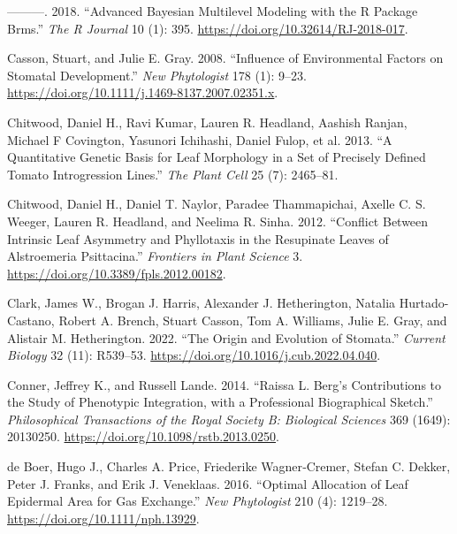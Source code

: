 \documentclass[
  12pt,
]{article}
\newlength{\cslhangindent}
\newlength{\cslentryspacingunit} %
\newenvironment{CSLReferences}[2] %
 {%
  \setlength{\parindent}{0pt}
  \ifodd #1
  \let\oldpar\par
  \def\par{\hangindent=\cslhangindent\oldpar}
  \fi
  \setlength{\parskip}{#2\cslentryspacingunit}
 }%
 {}
\begin{document}
\begin{CSLReferences}{1}{0}
\leavevmode{}%
---------. 2018. {``Advanced {Bayesian} {Multilevel} {Modeling} with the {R} {Package} Brms.''} \emph{The R Journal} 10 (1): 395. \url{https://doi.org/10.32614/RJ-2018-017}.

\leavevmode{}%
Casson, Stuart, and Julie E. Gray. 2008. {``Influence of Environmental Factors on Stomatal Development.''} \emph{New Phytologist} 178 (1): 9--23. \url{https://doi.org/10.1111/j.1469-8137.2007.02351.x}.

\leavevmode{}%
Chitwood, Daniel H., Ravi Kumar, Lauren R. Headland, Aashish Ranjan, Michael F Covington, Yasunori Ichihashi, Daniel Fulop, et al. 2013. {``A Quantitative Genetic Basis for Leaf Morphology in a Set of Precisely Defined Tomato Introgression Lines.''} \emph{The Plant Cell} 25 (7): 2465--81.

\leavevmode{}%
Chitwood, Daniel H., Daniel T. Naylor, Paradee Thammapichai, Axelle C. S. Weeger, Lauren R. Headland, and Neelima R. Sinha. 2012. {``Conflict Between {Intrinsic} {Leaf} {Asymmetry} and {Phyllotaxis} in the {Resupinate} {Leaves} of {Alstroemeria} Psittacina.''} \emph{Frontiers in Plant Science} 3. \url{https://doi.org/10.3389/fpls.2012.00182}.

\leavevmode{}%
Clark, James W., Brogan J. Harris, Alexander J. Hetherington, Natalia Hurtado-Castano, Robert A. Brench, Stuart Casson, Tom A. Williams, Julie E. Gray, and Alistair M. Hetherington. 2022. {``The Origin and Evolution of Stomata.''} \emph{Current Biology} 32 (11): R539--53. \url{https://doi.org/10.1016/j.cub.2022.04.040}.

\leavevmode{}%
Conner, Jeffrey K., and Russell Lande. 2014. {``Raissa {L}. {Berg}'s Contributions to the Study of Phenotypic Integration, with a Professional Biographical Sketch.''} \emph{Philosophical Transactions of the Royal Society B: Biological Sciences} 369 (1649): 20130250. \url{https://doi.org/10.1098/rstb.2013.0250}.

\leavevmode{}%
de Boer, Hugo J., Charles A. Price, Friederike Wagner‐Cremer, Stefan C. Dekker, Peter J. Franks, and Erik J. Veneklaas. 2016. {``Optimal Allocation of Leaf Epidermal Area for Gas Exchange.''} \emph{New Phytologist} 210 (4): 1219--28. \url{https://doi.org/10.1111/nph.13929}.


\end{CSLReferences}
\end{document}
